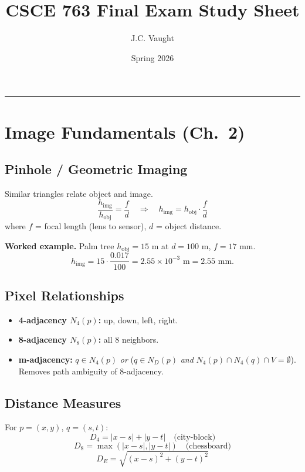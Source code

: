 \documentclass[10pt]{article}
\title{\color{garnet}\textbf{CSCE 763 Final Exam Study Sheet}}
\author{J.C. Vaught}
\date{Spring 2026}
\begin{document}
\maketitle
\vspace{-1.5em}
\hrule
\vspace{0.5em}

\section{Image Fundamentals (Ch.~2)}

\subsection{Pinhole / Geometric Imaging}
\begin{tcolorbox}[studybox]
Similar triangles relate object and image.
\[
\frac{h_{\text{img}}}{h_{\text{obj}}} = \frac{f}{d}
\quad\Rightarrow\quad
h_{\text{img}} = h_{\text{obj}} \cdot \frac{f}{d}
\]
where $f$ = focal length (lens to sensor), $d$ = object distance.
\end{tcolorbox}

\textbf{Worked example.} Palm tree $h_{\text{obj}} = 15$ m at $d = 100$ m, $f = 17$ mm.
\[
h_{\text{img}} = 15 \cdot \frac{0.017}{100} = 2.55 \times 10^{-3}\text{ m} = 2.55\text{ mm}.
\]

\subsection{Pixel Relationships}
\begin{itemize}
  \item \textbf{4-adjacency $N_4(p)$:} up, down, left, right.
  \item \textbf{8-adjacency $N_8(p)$:} all 8 neighbors.
  \item \textbf{m-adjacency:} $q \in N_4(p)$ \emph{or} ($q \in N_D(p)$ \emph{and} $N_4(p)\cap N_4(q)\cap V = \emptyset$). Removes path ambiguity of 8-adjacency.
\end{itemize}

\subsection{Distance Measures}
\begin{tcolorbox}[studybox]
For $p=(x,y)$, $q=(s,t)$:
\[
D_4 = |x-s|+|y-t| \quad\text{(city-block)}
\]
\[
D_8 = \max(|x-s|,|y-t|) \quad\text{(chessboard)}
\]
\[
D_E = \sqrt{(x-s)^2+(y-t)^2}
\]
\end{tcolorbox}
\end{document}
